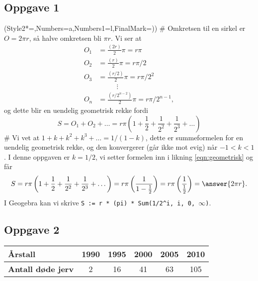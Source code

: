 \subsection*{Oppgave 1}
\begin{easylist}[enumerate]
\ListProperties(Style2*=,Numbers=a,Numbers1=l,FinalMark={)})
# Omkretsen til en sirkel er $O = 2 \pi r$, så halve omkretsen bli $\pi r$.
Vi ser at 
\begin{align*}
	O_1 &=  \frac{(2r)}{2} \pi = r \pi \\
	O_2 &=  \frac{(r)}{2} \pi = r \pi /2 \\
	O_3 &=  \frac{(r/2)}{2} \pi = r \pi / 2^2 \\
	 &\ \ \ \qquad \vdots \\
	O_n &=  \frac{(r/2^{n-2})}{2} \pi = r \pi / 2^{n-1},
\end{align*}
og dette blir en uendelig geometrisk rekke fordi
\begin{equation}
\label{eqn:geometrisk}
	S = O_1 + O_2  + \dots =  r \pi \left( 1 + \frac{1}{2} + 
	\frac{1}{2^2} + \frac{1}{2^3} + \dots \right)
\end{equation}
# Vi vet at $1 + k + k^2 + k^3 + \dots = 1/ (1-k)$, dette er summeformelen for en uendelig geometrisk rekke, og den konvergerer (går ikke mot evig) når $-1 < k < 1$. I denne oppgaven er $k = 1/2$, vi setter formelen inn i likning \eqref{eqn:geometrisk} og får 
\begin{equation*}
S =  r \pi \left( 1 + \frac{1}{2} + 
\frac{1}{2^2} + \frac{1}{2^3} + \dots \right)
=  r \pi \left( \frac{1}{1 - \frac{1}{2}} \right)
=  r \pi \left( \frac{1}{\frac{1}{2}} \right)
 = \answer{2 \pi r}.
\end{equation*}
I Geogebra kan vi skrive \verb|S := r * (pi) * Sum(1/2^i, i, 0, |$\infty$\verb|)|.
\end{easylist}

\subsection*{Oppgave 2}

\begin{center}
	\begin{tabular}{|l|c|c|c|c|c|}
		\hline
		\textbf{Årstall} & 1990 & 1995 & 2000 & 2005 & 2010 \\ \hline
		\textbf{Antall døde jerv} & 2 & 16 & 41 & 63 & 105 \\ \hline
	\end{tabular}
\end{center}


